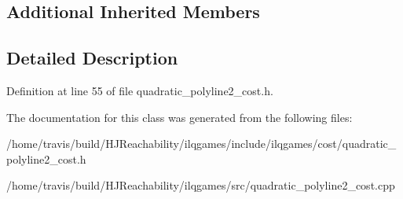 \subsection*{Additional Inherited Members}


\subsection{Detailed Description}


Definition at line 55 of file quadratic\+\_\+polyline2\+\_\+cost.\+h.



The documentation for this class was generated from the following files\+:\begin{DoxyCompactItemize}
\item 
/home/travis/build/\+H\+J\+Reachability/ilqgames/include/ilqgames/cost/quadratic\+\_\+polyline2\+\_\+cost.\+h\item 
/home/travis/build/\+H\+J\+Reachability/ilqgames/src/quadratic\+\_\+polyline2\+\_\+cost.\+cpp\end{DoxyCompactItemize}
